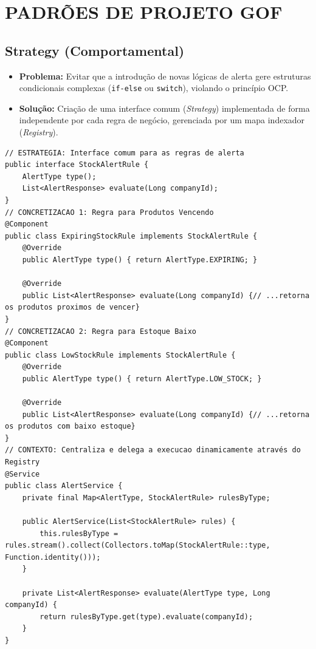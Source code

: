 \documentclass[12pt,a4paper]{article}
\begin{document}
\newpage
\section{PADRÕES DE PROJETO GOF}

\subsection{Strategy (Comportamental)}
\begin{itemize}
    \item \textbf{Problema:} Evitar que a introdução de novas lógicas de alerta gere estruturas condicionais complexas (\texttt{if-else} ou \texttt{switch}), violando o princípio OCP.
    \item \textbf{Solução:} Criação de uma interface comum (\textit{Strategy}) implementada de forma independente por cada regra de negócio, gerenciada por um mapa indexador (\textit{Registry}).
\end{itemize}

\begin{lstlisting}
// ESTRATEGIA: Interface comum para as regras de alerta
public interface StockAlertRule {
    AlertType type();
    List<AlertResponse> evaluate(Long companyId);
}
// CONCRETIZACAO 1: Regra para Produtos Vencendo
@Component
public class ExpiringStockRule implements StockAlertRule {
    @Override
    public AlertType type() { return AlertType.EXPIRING; }
    
    @Override
    public List<AlertResponse> evaluate(Long companyId) {// ...retorna os produtos proximos de vencer}
}
// CONCRETIZACAO 2: Regra para Estoque Baixo
@Component
public class LowStockRule implements StockAlertRule {
    @Override
    public AlertType type() { return AlertType.LOW_STOCK; }
    
    @Override
    public List<AlertResponse> evaluate(Long companyId) {// ...retorna os produtos com baixo estoque}
}
// CONTEXTO: Centraliza e delega a execucao dinamicamente através do Registry
@Service
public class AlertService {
    private final Map<AlertType, StockAlertRule> rulesByType;

    public AlertService(List<StockAlertRule> rules) {
        this.rulesByType = rules.stream().collect(Collectors.toMap(StockAlertRule::type, Function.identity()));
    }

    private List<AlertResponse> evaluate(AlertType type, Long companyId) {
        return rulesByType.get(type).evaluate(companyId);
    }
}
\end{lstlisting}
\end{document}

